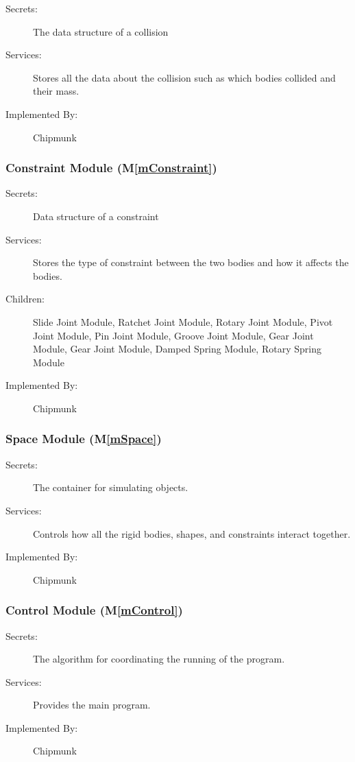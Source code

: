 \documentclass[12pt]{article}
\newcommand{\mref}[1]{M\ref{#1}}
\begin{document}
\begin{description}
\item[Secrets:]The data structure of a collision
\item[Services:]Stores all the data about the collision such as which bodies 
collided and their mass.
\item[Implemented By:] Chipmunk
\end{description}

\subsubsection{Constraint Module (\mref{mConstraint})}

\begin{description}
\item[Secrets:]  Data structure of a constraint
\item[Services:] Stores the type of constraint between the two bodies and how
it affects the bodies. 
\item[Children:] Slide Joint Module, Ratchet Joint Module, Rotary Joint Module, 
Pivot Joint Module, Pin Joint Module, Groove Joint Module, Gear Joint Module, 
Gear Joint Module, Damped Spring Module, Rotary Spring Module
\item[Implemented By:] Chipmunk
\end{description} 

\subsubsection{Space Module (\mref{mSpace})}

\begin{description}
\item[Secrets:] The container for simulating objects.
\item[Services:]Controls how all the rigid bodies, shapes, and constraints interact
together.
\item[Implemented By:] Chipmunk
\end{description} 
 
\subsubsection{Control Module (\mref{mControl})}

\begin{description}
\item[Secrets:] The algorithm for coordinating the running of the program.
\item[Services:] Provides the main program.
\item[Implemented By:] Chipmunk
\end{description}
\end{document}
